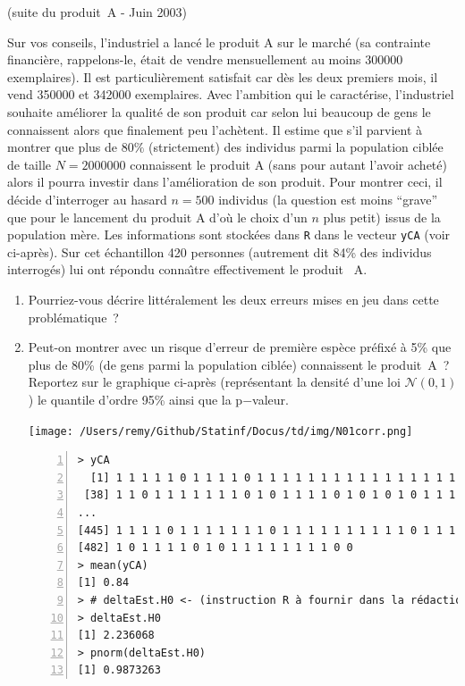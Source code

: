 \documentclass[10pt]{report}
\begin{document}
\begin{exercice} (suite du produit~A - Juin 2003)

Sur vos conseils, l'industriel a lanc{\'e} le produit A sur le march{\'e} (sa contrainte financi{\`e}re, rappelons-le, {\'e}tait de vendre mensuellement au moins 300000 exemplaires). Il est particuli{\`e}rement satisfait car d{\`e}s les deux premiers mois, il vend 350000 et 342000 exemplaires. Avec l'ambition qui le caract{\'e}rise, l'industriel souhaite am{\'e}liorer la qualit{\'e} de son produit car selon lui beaucoup de gens le connaissent alors que finalement peu l'ach{\`e}tent. Il estime que s'il parvient {\`a} montrer que plus de $80\%$ (strictement) des individus parmi la population cibl{\'e}e de taille $N=2000000$ connaissent le produit A (sans pour autant l'avoir achet{\'e}) alors il pourra investir dans l'am{\'e}lioration de son produit. Pour montrer ceci, il d{\'e}cide d'interroger au hasard $n=500$ individus (la question est moins ``grave'' que pour le lancement du produit A d'o{\`u} le choix d'un $n$ plus petit) issus de la population m{\`e}re. Les informations sont stock{\'e}es dans \texttt{R} dans le vecteur \texttt{yCA} (voir ci-apr{\`e}s). Sur cet {\'e}chantillon 420 personnes (autrement dit 84\% des individus interrog{\'e}s) lui ont r{\'e}pondu conna{\^\i}tre effectivement le produit~ A. \\
\begin{enumerate}
\item Pourriez-vous d{\'e}crire litt{\'e}ralement les deux erreurs mises en jeu dans cette probl{\'e}matique~? 



\item Peut-on montrer avec un risque d'erreur de premi{\`e}re esp{\`e}ce pr{\'e}fix{\'e} {\`a} 5\% que plus de 80\% (de gens parmi la population cibl{\'e}e) connaissent le produit~A~? Reportez sur le graphique ci-apr{\`e}s (repr{\'e}sentant la densit{\'e} d'une loi $\mathcal{N}(0,1)$) le quantile d'ordre 95\% ainsi que la p$-$valeur. 
 

\begin{center} 
\texttt{[image: /Users/remy/Github/Statinf/Docus/td/img/N01corr.png]}
\end{center}

\IndicR
\begin{Verbatim}[frame=leftline,fontfamily=tt,fontshape=n,numbers=left]
> yCA
  [1] 1 1 1 1 1 0 1 1 1 1 0 1 1 1 1 1 1 1 1 1 1 1 1 1 1 1 1 1 1 1 1 1 1 1 1 1 0
 [38] 1 1 0 1 1 1 1 1 1 1 0 1 0 1 1 1 1 0 1 0 1 0 1 0 1 1 1 0 1 1 1 1 1 0 1 1 1
...
[445] 1 1 1 1 0 1 1 1 1 1 1 1 0 1 1 1 1 1 1 1 1 1 1 0 1 1 1 1 1 1 1 1 1 1 1 1 1
[482] 1 0 1 1 1 1 0 1 0 1 1 1 1 1 1 1 1 0 0
> mean(yCA)
[1] 0.84
> # deltaEst.H0 <- (instruction R à fournir dans la rédaction)
> deltaEst.H0
[1] 2.236068
> pnorm(deltaEst.H0)
[1] 0.9873263
\end{Verbatim}




\end{enumerate}
\end{exercice}
\end{document}
